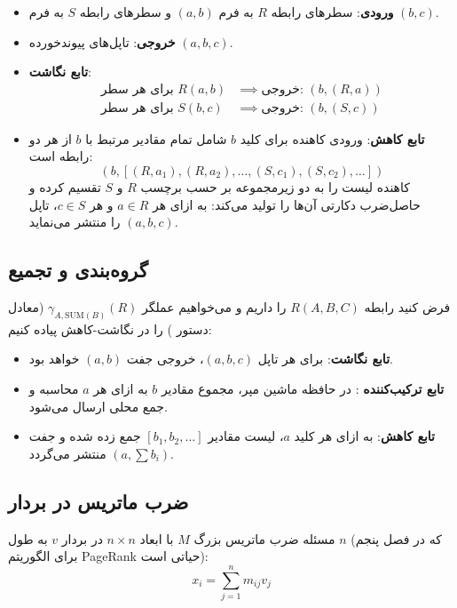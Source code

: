 \begin{algorithmbox}
\begin{itemize}
    \item \textbf{ورودی}: سطرهای رابطه $R$ به فرم $(a, b)$ و سطرهای رابطه $S$ به فرم $(b, c)$.
    \item \textbf{خروجی}: تاپل‌های پیوندخورده $(a, b, c)$.
    \item \textbf{تابع نگاشت}:
    \begin{align}
    \text{برای هر سطر } R(a, b) &\implies \text{خروجی: } (b, (R, a)) \\
    \text{برای هر سطر } S(b, c) &\implies \text{خروجی: } (b, (S, c))
    \end{align}
    \item \textbf{تابع کاهش}: ورودی کاهنده برای کلید $b$ شامل تمام مقادیر مرتبط با $b$ از هر دو رابطه است:
    \begin{equation}
    (b, [(R, a_1), (R, a_2), \dots, (S, c_1), (S, c_2), \dots])
    \end{equation}
    کاهنده لیست را به دو زیرمجموعه بر حسب برچسب $R$ و $S$ تقسیم کرده و حاصل‌ضرب دکارتی آن‌ها را تولید می‌کند: به ازای هر $a \in R$ و هر $c \in S$، تاپل $(a, b, c)$ را منتشر می‌نماید.
\end{itemize}
\end{algorithmbox}

\subsection{گروه‌بندی و تجمیع \texorpdfstring{}{(Grouping and Aggregation)}}
فرض کنید رابطه $R(A, B, C)$ را داریم و می‌خواهیم عملگر $\gamma_{A, \text{SUM}(B)}(R)$ (معادل دستور ) را در نگاشت-کاهش پیاده کنیم:
\begin{itemize}
    \item \textbf{تابع نگاشت}: برای هر تاپل $(a, b, c)$، خروجی جفت $(a, b)$ خواهد بود.
    \item \textbf{تابع ترکیب‌کننده }: در حافظه ماشین مپر، مجموع مقادیر $b$ به ازای هر $a$ محاسبه و جمع محلی ارسال می‌شود.
    \item \textbf{تابع کاهش}: به ازای هر کلید $a$، لیست مقادیر $[b_1, b_2, \dots]$ جمع زده شده و جفت $(a, \sum b_i)$ منتشر می‌گردد.
\end{itemize}

\subsection{ضرب ماتریس در بردار \texorpdfstring{}{(Matrix-Vector Multiplication)}}
مسئله ضرب ماتریس بزرگ $M$ با ابعاد $n \times n$ در بردار $v$ به طول $n$ (که در فصل پنجم برای الگوریتم PageRank حیاتی است):
\begin{equation}
x_i = \sum_{j=1}^n m_{ij} v_j
\end{equation}

